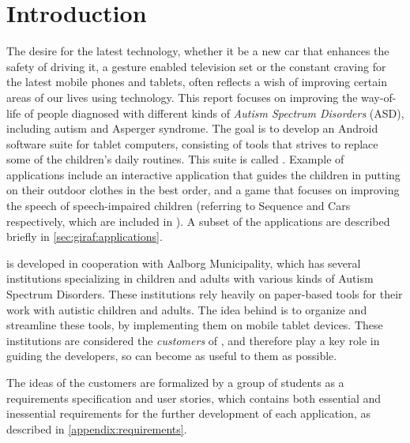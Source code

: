 \newcommand{\headerIntroduction}{Introduction}
\chapter*{\headerIntroduction}\label{chap:introduction}
\addcontentsline{toc}{chapter}{\headerIntroduction}

The desire for the latest technology, whether it be a new car that enhances the safety of driving it, a gesture enabled television set or the constant craving for the latest mobile phones and tablets, often reflects a wish of improving certain areas of our lives using technology.
This report focuses on improving the way-of-life of people diagnosed with different kinds of \textit{Autism Spectrum Disorders} (ASD), including autism and Asperger syndrome.
The goal is to develop an Android software suite for tablet computers, consisting of tools that strives to replace some of the children's daily routines. This suite is called \giraf.
Example of \giraf applications include an interactive application that guides the children in putting on their outdoor clothes in the best order, and a game that focuses on improving the speech of speech-impaired children (referring to Sequence and Cars respectively, which are included in \giraf).
A subset of the \giraf applications are described briefly in \cref{sec:giraf:applications}.

\giraf is developed in cooperation with Aalborg Municipality, which has several institutions specializing in children and adults with various kinds of Autism Spectrum Disorders.
These institutions rely heavily on paper-based tools for their work with autistic children and adults. 
The idea behind \giraf is to organize and streamline these tools, by implementing them on mobile tablet devices.
These institutions are considered the \textit{customers} of \giraf, and therefore play a key role in guiding the developers, so \giraf can become as useful to them as possible.

The ideas of the customers are formalized by a group of students as a requirements specification and user stories, which contains both essential and inessential requirements for the further development of each application, as described in \cref{appendix:requirements}.